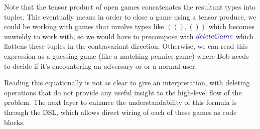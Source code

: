 \documentclass[11pt,titlepage,dvipsnames,table,xcdraw,english]{article}
\newcommand{\Conid}[1]{\mathit{#1}}
\newcommand{\Varid}[1]{\mathit{#1}}
\def\resethooks{%
  \global\let\SaveRestoreHook\empty
  \global\let\ColumnHook\empty}
\newcommand{\hsindent}[1]{\quad}%
\let\hspre\empty
\let\hspost\empty
\renewcommand{\Conid}[1]{{\color{funcColor}{#1}}}
\renewcommand{\Varid}[1]{{\color{typeColor}{#1}}}
\begin{document}
\resethooks
Note that the tensor product of open games concatenates the resultant types into tuples. This eventually means in order to close a game using a tensor produce, we could be working with games that involve types like \ensuremath{((),())} which becomes unwieldy to work with, so we would have to precompose with \ensuremath{\Varid{deleteGame}} which flattens these tuples in the contravariant direction. Otherwise, we can read this expression as a guessing game (like a matching pennies game) where Bob needs to decide if it's encountering an adversary or or a normal user.

Reading this equationally is not as clear to give an interpretation, with deleting operations that do not provide any useful insight to the high-level flow of the problem. The next layer to enhance the understandability of this formula is through the DSL, which allows direct wiring of each of these games as code blocks.
\end{document}
